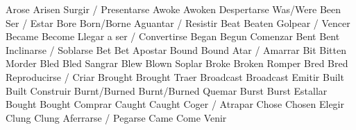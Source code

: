               {Arose}{}	            {Arisen}{}              {Surgir / Presentarse}{}
              {Awoke}{}	            {Awoken}{}              {Despertarse}{}
                 {Was/Were}{}	        {Been}{}                {Ser / Estar}{}
               {Bore}{}	            {Born/Borne}{}          {Aguantar / Resistir}{}
	            {Beat}{}	            {Beaten}{}              {Golpear / Vencer}{}
	            {Became}{}	            {Become}{}              {Llegar a ser / Convertirse}{}
	            {Began}{}	            {Begun}{}               {Comenzar}{}
	            {Bent}{}	            {Bent}{}                {Inclinarse / Soblarse}{}
	            {Bet}{}	                {Bet}{}                 {Apostar}{}
	            {Bound}{}	            {Bound}{}               {Atar / Amarrar}{}
	            {Bit}{}	                {Bitten}{}              {Morder}{}
	            {Bled}{}	            {Bled}{}                {Sangrar}{}
	            {Blew}{}	            {Blown}{}               {Soplar}{}
	            {Broke}{}	            {Broken}{}              {Romper}{}
	            {Bred}{}	            {Bred}{}                {Reproducirse / Criar}{}
	            {Brought}{}	            {Brought}{}             {Traer}{}
	        {Broadcast}{}	        {Broadcast}{}           {Emitir}{}
	            {Built}{}	            {Built}{}               {Construir}{}
	            {Burnt/Burned}{}	    {Burnt/Burned}{}        {Quemar}{}
	            {Burst}{}	            {Burst}{}               {Estallar}{}
	            {Bought}{}	            {Bought}{}              {Comprar}{}
	            {Caught}{}	            {Caught}{}              {Coger / Atrapar}{}
	            {Chose}{}	            {Chosen}{}              {Elegir}{}
	            {Clung}{}	            {Clung}{}               {Aferrarse / Pegarse}{}
	            {Came}{}	            {Come}{}                {Venir}{}
